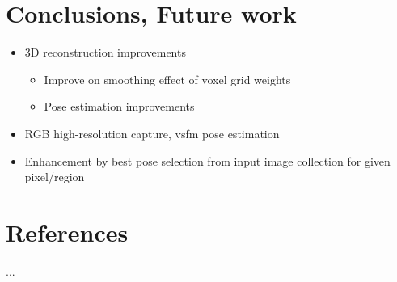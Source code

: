 \documentclass[12pt,a4paper]{article}
\begin{document}
\section{Conclusions, Future work}
	\begin{itemize}
		\item 3D reconstruction improvements
			\begin{itemize}
				\item Improve on smoothing effect of voxel grid weights
				\item Pose estimation improvements
			\end{itemize}
		\item RGB high-resolution capture, vsfm pose estimation 
		\item Enhancement by best pose selection from input image collection for given pixel/region
	\end{itemize}

\section{References}
	...
	
\cite{Lowe04}



	
\end{document}
